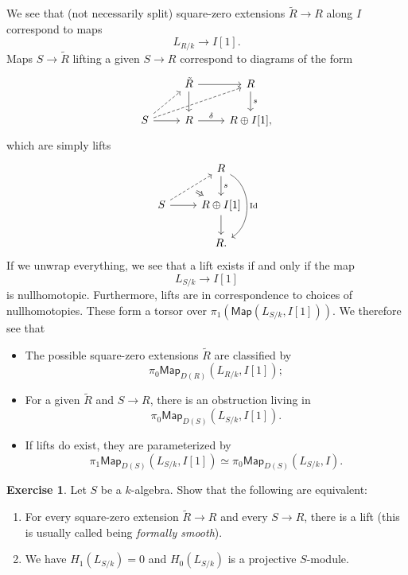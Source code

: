 \documentclass[10pt]{amsart}
\theoremstyle{definition}
\newtheorem{exer}[thm]{Exercise}
\theoremstyle{remark}
\theoremstyle{plain}
\theoremstyle{definition}
\theoremstyle{remark}
\newcommand{\mr}[1]{\mathrm{#1}}
\newcommand{\ms}[1]{\mathsf{#1}}
\newcommand{\1}{\mathbf{1}}
\newcommand{\2}{\mathbf{2}}
\newcommand{\3}{\mathbf{3}}
\begin{document}
We see that (not necessarily split) square-zero extensions $\tilde{R} \to R$ along $I$ correspond to maps
\[ L_{R/k} \to I[1]. \]
Maps $S \to \tilde{R}$ lifting a given $S \to R$ correspond to diagrams of the form
\begin{equation*}
\begin{tikzcd}
    & \tilde{R} \ar{r} \ar{d} & R \ar{d}{s} \\
    S \ar[dashrightarrow]{ur} \ar[dashrightarrow]{urr} \ar{r} & R \ar{r}{\delta} & R \oplus I[1],
\end{tikzcd}
\end{equation*}
which are simply lifts
\begin{equation*}
\begin{tikzcd}
    & R \ar{d}{s} \ar[bend left=60]{dd}{\mr{Id}} \\
    S \ar[dashrightarrow,""{swap,name=L}]{ur} \ar{r} & R \oplus I[1] \ar{d} \ar[Leftarrow, to=L] \\
    & R.
\end{tikzcd}
\end{equation*}
If we unwrap everything, we see that a lift exists if and only if the map
\[ L_{S/k} \to I[1] \]
is nullhomotopic. Furthermore, lifts are in correspondence to choices of nullhomotopies. These form a torsor over $\pi_1(\ms{Map}(L_{S/k}, I[1]))$. We therefore see that
\begin{itemize}
    \item The possible square-zero extensions $\tilde{R}$ are classified by
    \[ \pi_0 \ms{Map}_{D(R)} (L_{R/k}, I[1]); \]
    \item For a given $\tilde{R}$ and $S \to R$, there is an obstruction living in
    \[ \pi_0 \ms{Map}_{D(S)} (L_{S/k}, I[1]). \]
    \item If lifts do exist, they are parameterized by
    \[ \pi_1 \ms{Map}_{D(S)} (L_{S/k}, I[1]) \simeq \pi_0 \ms{Map}_{D(S)}(L_{S/k}, I). \]
\end{itemize}

\begin{exer}
    Let $S$ be a $k$-algebra. Show that the following are equivalent:
    \begin{enumerate}
        \item For every square-zero extension $\tilde{R} \to R$ and every $S \to R$, there is a lift (this is usually called being \textit{formally smooth}).
        \item We have $H_1(L_{S/k})= 0$ and $H_0(L_{S/k})$ is a projective $S$-module.
    \end{enumerate}
\end{exer}
\end{document}
